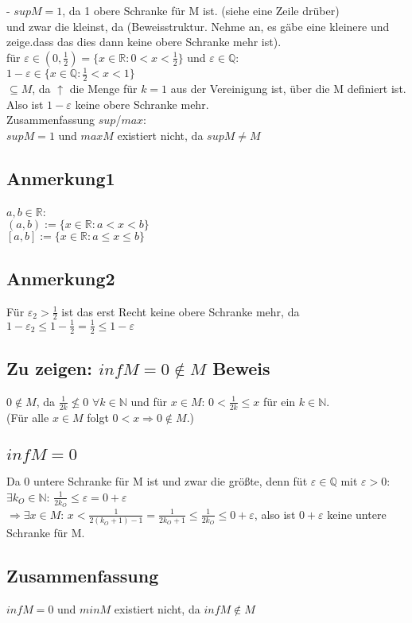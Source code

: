 \documentclass[11pt]{scrartcl}
\begin{document}
- $sup M=1 $, da 1 obere Schranke für M ist. (siehe eine Zeile drüber) \\

und zwar die kleinst, da (Beweisstruktur. Nehme an, es gäbe eine kleinere und zeige.dass das dies dann keine obere Schranke mehr ist). \\
für $\varepsilon \in (0, \frac{1}{2}) = \{ x \in \mathbb{R} : 0 < x < \frac{1}{2} \}$ und $\varepsilon \in \mathbb{Q}$: \\


$1-\varepsilon \in \{x \in \mathbb{Q} : \frac{1}{2} < x < 1 \}$ \\


$\subseteq M $, da $\uparrow$ die Menge für $k=1$ aus der Vereinigung ist, über die M definiert ist. Also ist $1 - \varepsilon$ keine obere Schranke  mehr. \\
Zusammenfassung $sup$/$max$: \\
$sup M =1$ und $max M$ existiert nicht, da $sup M \neq M$
\subsection*{Anmerkung1}
$a,b \in \mathbb{R}$: \\
$(a,b) := \{ x \in \mathbb{R} : a < x < b\}$ \\
$[a,b] := \{ x \in \mathbb{R} : a \leq x \leq b\}$

\subsection*{Anmerkung2}
Für $\varepsilon_2 > \frac{1}{2}$ ist das erst Recht keine obere Schranke mehr, da \\
$1 - \varepsilon_2 \leq 1-\frac{1}{2} = \frac{1}{2} \leq 1 - \varepsilon$




\subsection*{Zu zeigen: $inf M=0 \notin M$ Beweis}
$0 \notin M$, da $\frac{1}{2k} \nleq 0$  $\forall k \in \mathbb{N}$ und für $x \in M$: $0 < \frac{1}{2k} \leq x $ für ein $k \in \mathbb{N}$. \\
(Für alle $x \in M$ folgt $0<x \Rightarrow 0 \notin M$.) 
\subsection*{$inf M=0$}
Da 0 untere Schranke für M ist und zwar die größte, denn füt $\varepsilon \in \mathbb{Q}$ mit $\varepsilon > 0$: \\
$\exists k_O \in \mathbb{N}$: $\frac{1}{2k_O} \leq \varepsilon = 0 + \varepsilon $ \\
$\Rightarrow \exists x \in M$: $x < \frac{1}{2(k_O+1)-1} = \frac{1}{2k_O +1} \leq \frac{1}{2k_O} \leq 0+\varepsilon$, also ist $0+\varepsilon$ keine  untere Schranke für M.
\subsection*{Zusammenfassung}
$inf M =0$ und $min M$ existiert nicht, da $inf M \notin M$
\end{document}
